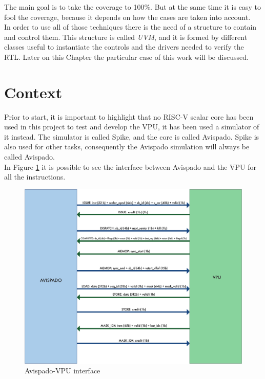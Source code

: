 The main goal is to take the coverage to 100\%. But at the same time it is easy to fool the coverage, because it depends on how the cases are taken into account. \\

In order to use all of those techniques there is the need of a structure to contain and control them.
This structure is called \textit{UVM}, and it is formed by different classes useful to instantiate the controls and the drivers needed to verify the RTL. Later on this Chapter the particular case of this work will be discussed.

\section{Context}
Prior to start, it is important to highlight that no RISC-V scalar core has been used in this project to test and develop the VPU, it has been used a simulator of it instead. The simulator is called Spike, and the core is called Avispado. Spike is also used for other tasks, consequently the Avispado simulation will always be called Avispado.\\
In Figure \ref{avi-vpu} it is possible to see the interface between Avispado and the VPU for all the instructions.\\

\begin{figure}[H]
    \centering
    \includegraphics[scale = 0.6]{Chapter_1/img/avi-vpu.png}
    \caption{Avispado-VPU interface}
    \label{avi-vpu}
\end{figure}


